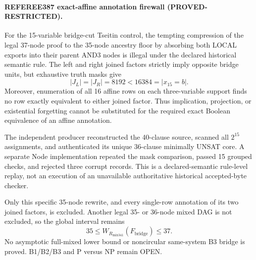 \paragraph{REFEREE387 exact-affine annotation firewall (PROVED-RESTRICTED).}
For the 15-variable bridge-cut Tseitin control, the tempting compression of
the legal 37-node proof to the 35-node ancestry floor by absorbing both
LOCAL exports into their parent AND3 nodes is illegal under the declared
historical semantic rule.  The left and right joined factors strictly imply
opposite bridge units, but exhaustive truth masks give
\[
 |J_L|=|J_R|=8192<16384=|x_{15}=b|.
\]
Moreover, enumeration of all 16 affine rows on each three-variable support
finds no row exactly equivalent to either joined factor.  Thus implication,
projection, or existential forgetting cannot be substituted for the
required exact Boolean equivalence of an affine annotation.

The independent producer reconstructed the 40-clause source, scanned all
$2^{15}$ assignments, and authenticated its unique 36-clause minimally
UNSAT core.  A separate Node implementation repeated the mask comparison,
passed 15 grouped checks, and rejected three corrupt records.  This is a
declared-semantic rule-level replay, not an execution of an unavailable
authoritative historical accepted-byte checker.

Only this specific 35-node rewrite, and every single-row annotation of its
two joined factors, is excluded.  Another legal 35- or 36-node mixed DAG is
not excluded, so the global interval remains
\[
 35\le W_{R_{\mathrm{mix341}}}(F_{\mathrm{bridge}})\le37.
\]
No asymptotic full-mixed lower bound or noncircular same-system B3 bridge is
proved.  B1/B2/B3 and P versus NP remain OPEN.
